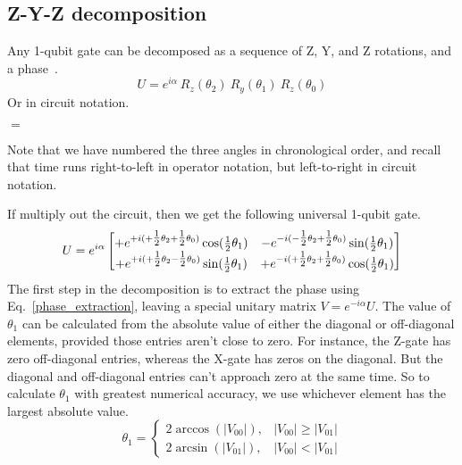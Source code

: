 \subsection{Z-Y-Z decomposition}
\label{sec:ZYZdeke}
Any 1-qubit gate can be decomposed as a sequence of Z, Y, and Z rotations, and a phase~\cite{Barenco1995b}.
\[
U =  e^{i\alpha}\ R_z(\theta_2)\ R_y(\theta_1)\ R_z(\theta_0)
\]
Or in circuit notation.
\begin{center}
$=$

\end{center}
Note that we have numbered the three angles in chronological order, and recall that time runs right-to-left in operator notation, but left-to-right in circuit notation. 

If multiply out the circuit, then we get the following universal 1-qubit gate.
\[
U = 
e^{i\alpha} \begin{bmatrix}
+e^{+i(+\tfrac{1}{2}\theta_2 + \tfrac{1}{2}\theta_0)} \cos(\tfrac{1}{2}\theta_1) 
& -e^{-i(-\tfrac{1}{2}\theta_2 + \tfrac{1}{2}\theta_0)} \sin(\tfrac{1}{2}\theta_1) 
\\
+e^{+i(+\tfrac{1}{2}\theta_2 - \tfrac{1}{2}\theta_0)} \sin(\tfrac{1}{2}\theta_1) 
& +e^{-i(+\tfrac{1}{2}\theta_2 +\tfrac{1}{2}\theta_0)} \cos(\tfrac{1}{2}\theta_1)
\end{bmatrix}
\]
The first step in the decomposition is to extract the phase using Eq.~\eqref{phase_extraction}, leaving a special unitary matrix $V = e^{-i\alpha} U$.
%
The value of $\theta_1$ can be calculated from the absolute value of either the diagonal or off-diagonal elements, provided those entries aren't close to zero.
For instance, the Z-gate has zero off-diagonal entries, whereas the X-gate has zeros on the diagonal. But the diagonal and off-diagonal entries can't approach zero at the same time.  So to calculate $\theta_1$ with greatest numerical accuracy, we use whichever element has the largest absolute value.
\[
\theta_1 = 
  \begin{cases}
		2 \arccos(|V_{00}|), & |V_{00}| \geq |V_{01}|\\	
		2 \arcsin(|V_{01}|), & |V_{00}| < |V_{01}|		
	\end{cases} 
\]

